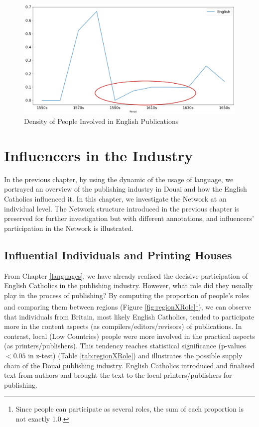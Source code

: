 \documentclass[12pt,a4paper,oneside]{book}
\begin{document}
\begin{sloppypar}
\begin{figure}[H]
\centering
\includegraphics[scale=0.4]{graph/Average Density of English Publications.png}
\caption{Density of People Involved in English Publications}
\label{fig:avgDen}
\end{figure}

\chapter{Influencers in the Industry}
\label{influencers}
In the previous chapter, by using the dynamic of the usage of language, we portrayed an overview of the publishing industry in Douai and how the English Catholics influenced it. In this chapter, we investigate the Network at an individual level. The Network structure introduced in the previous chapter is preserved for further investigation but with different annotations, and influencers’ participation in the Network is illustrated.

\section{Influential Individuals and Printing Houses}
From Chapter \ref{languages}, we have already realised the decisive participation of English Catholics in the publishing industry. However, what role did they usually play in the process of publishing? By computing the proportion of people's roles and comparing them between regions (Figure \ref{fig:regionXRole}\footnote{Since people can participate as several roles, the sum of each proportion is not exactly 1.0.}), we can observe that individuals from Britain, most likely English Catholics, tended to participate more in the content aspects (as compilers/editors/revisors) of publications. In contrast, local (Low Countries) people were more involved in the practical aspects (as printers/publishers). This tendency reaches statistical significance (p-values $< 0.05$ in z-test) (Table \ref{tab:regionXRole}) and illustrates the possible supply chain of the Douai publishing industry. English Catholics introduced and finalised text from authors and brought the text to the local printers/publishers for publishing.


\end{sloppypar}
\end{document}
